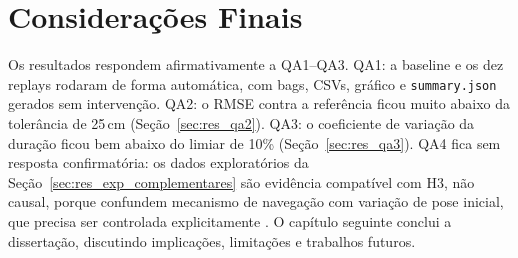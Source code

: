 \section{Considerações Finais}
\label{sec:res_conclusao}

Os resultados respondem afirmativamente a QA1--QA3. QA1: a baseline e os dez
replays rodaram de forma automática, com bags, CSVs, gráfico e
\texttt{summary.json} gerados sem intervenção. QA2: o RMSE contra a referência
ficou muito abaixo da tolerância de 25\,cm (Seção~\ref{sec:res_qa2}). QA3: o
coeficiente de variação da duração ficou bem abaixo do limiar de 10\%
(Seção~\ref{sec:res_qa3}). QA4 fica sem resposta confirmatória: os dados
exploratórios da Seção~\ref{sec:res_exp_complementares} são evidência
compatível com H3, não causal, porque confundem mecanismo de navegação com
variação de pose inicial, que precisa ser controlada explicitamente
\cite{bonsignorio2015}. O capítulo seguinte conclui a dissertação, discutindo
implicações, limitações e trabalhos futuros.
